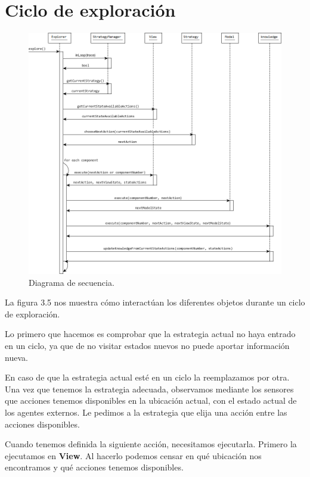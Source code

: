 \section{Ciclo de exploración}

\begin{figure}[H]
  \centering
    \includegraphics[width=1.0\textwidth]{Imagenes/Algoritmo/Secuencia_explorar.png}
  \caption{Diagrama de secuencia.}
  \label{fig:Secuencia_explorar}
\end{figure}

La figura 3.5 nos muestra cómo interactúan los diferentes objetos durante un ciclo de exploración.


Lo primero que hacemos es comprobar que la estrategia actual no haya entrado en un ciclo, ya que de no visitar estados nuevos no puede aportar información nueva.


En caso de que la estrategia actual esté en un ciclo la reemplazamos por otra. Una vez que tenemos la estrategia adecuada, observamos mediante los sensores que 
acciones tenemos disponibles en la ubicación actual, con el estado actual de los agentes externos. Le pedimos a la estrategia que elija una acción entre las 
acciones disponibles.


Cuando tenemos definida la siguiente acción, necesitamos ejecutarla. Primero la ejecutamos en \textbf{View}. Al hacerlo podemos censar en qué ubicación nos 
encontramos y qué acciones tenemos disponibles.


